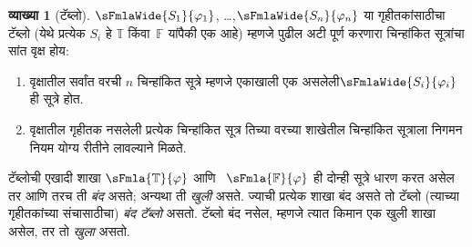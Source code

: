 \documentclass[11pt,a4paper,openany]{book}
\theoremstyle{definition}
\newtheorem{defn}{व्याख्या}[section]
\newcommand{\True}{\ensuremath{\mathbb{T}}}
\newcommand{\False}{\ensuremath{\mathbb{F}}}
\begin{document}
\begin{defn}[टॅब्लो]
$\sFmlaWide{S_1}{\varphi_1}$, \dots,\linebreak $\sFmlaWide{S_n}{\varphi_n}$ या गृहीतकांसाठीचा
टॅब्लो (येथे प्रत्येक $S_i$ हे $\True$ किंवा~$\False$ यांपैकी एक
आहे) म्हणजे पुढील अटी पूर्ण करणारा चिन्हांकित सूत्रांचा सांत वृक्ष होय:
\begin{enumerate}
\item वृक्षातील सर्वांत वरची $n$ चिन्हांकित सूत्रे म्हणजे एकाखाली एक
  असलेली\linebreak $\sFmlaWide{S_i}{\varphi_i}$ ही सूत्रे होत.
\item वृक्षातील गृहीतक नसलेली प्रत्येक चिन्हांकित सूत्र तिच्या वरच्या
  शाखेतील चिन्हांकित सूत्राला निगमन नियम योग्य रीतीने लावल्याने मिळते.
\end{enumerate}
टॅब्लोची एखादी शाखा $\sFmla{\True}{\varphi}$ आणि
~$\sFmla{\False}{\varphi}$ ही दोन्ही सूत्रे धारण करत असेल तर आणि तरच ती
\emph{बंद} असते; अन्यथा ती \emph{खुली} असते. ज्याची प्रत्येक शाखा बंद
असते तो टॅब्लो (त्याच्या गृहीतकांच्या संचासाठीचा)
\emph{बंद टॅब्लो} असतो. टॅब्लो बंद नसेल, म्हणजे त्यात किमान
एक खुली शाखा असेल, तर तो \emph{खुला} असतो.
\end{defn}
\end{document}
